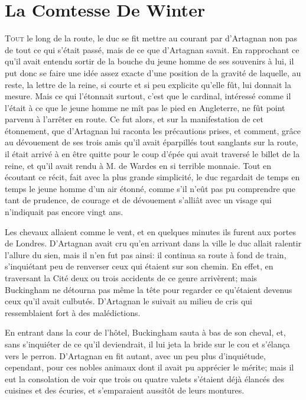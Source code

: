 
\chapter{La Comtesse De Winter}

\lettrine{T}{out} le long de la route, le duc se fit mettre au courant par d'Artagnan non pas de tout ce qui s'était passé, mais de ce que d'Artagnan savait. En rapprochant ce qu'il avait entendu sortir de la bouche du jeune homme de ses souvenirs à lui, il put donc se faire une idée assez exacte d'une position de la gravité de laquelle, au reste, la lettre de la reine, si courte et si peu explicite qu'elle fût, lui donnait la mesure. Mais ce qui l'étonnait surtout, c'est que le cardinal, intéressé comme il l'était à ce que le jeune homme ne mît pas le pied en Angleterre, ne fût point parvenu à l'arrêter en route. Ce fut alors, et sur la manifestation de cet étonnement, que d'Artagnan lui raconta les précautions prises, et comment, grâce au dévouement de ses trois amis qu'il avait éparpillés tout sanglants sur la route, il était arrivé à en être quitte pour le coup d'épée qui avait traversé le billet de la reine, et qu'il avait rendu à M. de Wardes en si terrible monnaie. Tout en écoutant ce récit, fait avec la plus grande simplicité, le duc regardait de temps en temps le jeune homme d'un air étonné, comme s'il n'eût pas pu comprendre que tant de prudence, de courage et de dévouement s'alliât avec un visage qui n'indiquait pas encore vingt ans. 

Les chevaux allaient comme le vent, et en quelques minutes ils furent aux portes de Londres. D'Artagnan avait cru qu'en arrivant dans la ville le duc allait ralentir l'allure du sien, mais il n'en fut pas ainsi: il continua sa route à fond de train, s'inquiétant peu de renverser ceux qui étaient sur son chemin. En effet, en traversant la Cité deux ou trois accidents de ce genre arrivèrent; mais Buckingham ne détourna pas même la tête pour regarder ce qu'étaient devenus ceux qu'il avait culbutés. D'Artagnan le suivait au milieu de cris qui ressemblaient fort à des malédictions. 

En entrant dans la cour de l'hôtel, Buckingham sauta à bas de son cheval, et, sans s'inquiéter de ce qu'il deviendrait, il lui jeta la bride sur le cou et s'élança vers le perron. D'Artagnan en fit autant, avec un peu plus d'inquiétude, cependant, pour ces nobles animaux dont il avait pu apprécier le mérite; mais il eut la consolation de voir que trois ou quatre valets s'étaient déjà élancés des cuisines et des écuries, et s'emparaient aussitôt de leurs montures. 

